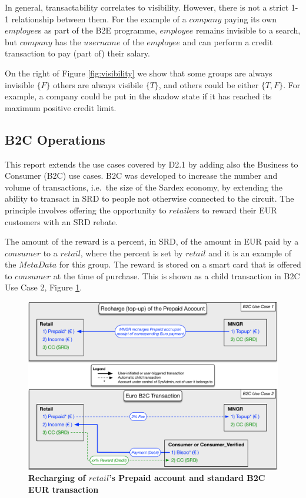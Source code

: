 In general, transactability correlates to visibility. However, there is not a strict 1-1 relationship between them. For the example of a $company$ paying its own $employee$s as part of the B2E programme, $employee$ remains invisible to a search, but $company$ has the $username$ of the $employee$ and can perform a credit transaction to pay (part of) their salary.

On the right of Figure \ref{fig:visibility} we show that some groups are always invisible $\{ F \}$ others are always visibile $\{ T \}$, and others could be either $\{T, F\}$. For example, a company could be put in the shadow state if it has reached its maximum positive credit limit.

\subsection{B2C Operations}
This report extends the use cases covered by D2.1 by adding also the Business to Consumer (B2C) use cases. B2C was developed to increase the number and volume of transactions, i.e.\ the size of the Sardex economy, by extending the ability to transact in SRD to people not otherwise connected to the circuit. The principle involves offering the opportunity to $retail$ers to reward their EUR customers with an SRD rebate.

The amount of the reward is a percent, in SRD, of the amount in EUR paid by a $consumer$ to a $retail$, where the percent is set by $retail$ and it is an example of the $MetaData$ for this group. The reward is stored on a smart card that is offered to $consumer$ at the time of purchase. This is shown as a child transaction in B2C Use Case 2, Figure \ref{fig:B2C1}.

\begin{figure}[htbp]
\centering
\includegraphics[width=15cm]{Figures/B2C1}
\caption{\small\textbf{Recharging of $retail$'s Prepaid account and standard B2C EUR transaction}}
\label{fig:B2C1}
\end{figure}

